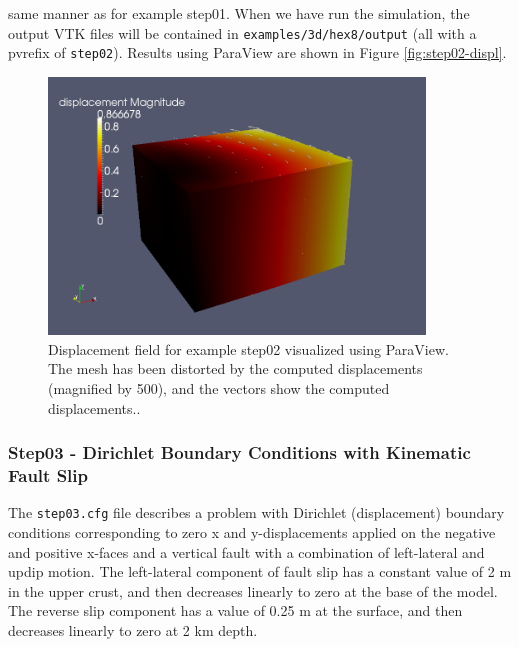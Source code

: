 same manner as for example step01. When we have run the simulation,
the output VTK files will be contained in \texttt{examples/3d/hex8/output}
(all with a pvrefix of \texttt{step02}). Results using ParaView are
shown in Figure \vref{fig:step02-displ}.
\begin{figure}
\centering{}\includegraphics[width=10cm]{tutorials/3dhex8/figs/step02-displ}\caption{Displacement field for example step02 visualized using ParaView. The
mesh has been distorted by the computed displacements (magnified by
500), and the vectors show the computed displacements.\label{fig:step02-displ}.}
\end{figure}



\subsubsection{Step03 - Dirichlet Boundary Conditions with Kinematic Fault Slip}

The \texttt{step03.cfg} file describes a problem with Dirichlet (displacement)
boundary conditions corresponding to zero x and y-displacements applied
on the negative and positive x-faces and a vertical fault with a combination
of left-lateral and updip motion. The left-lateral component of fault
slip has a constant value of 2 m in the upper crust, and then decreases
linearly to zero at the base of the model. The reverse slip component
has a value of 0.25 m at the surface, and then decreases linearly
to zero at 2 km depth.

